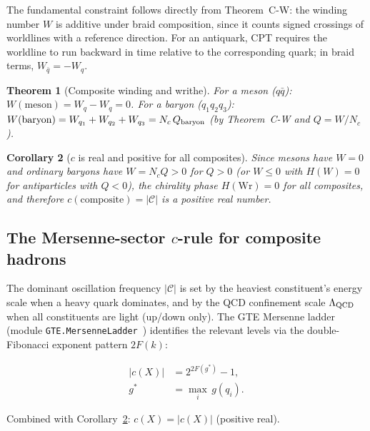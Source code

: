 \documentclass[11pt]{article}
\newtheorem{theorem}{Theorem}[section]
\newtheorem{corollary}[theorem]{Corollary}
\theoremstyle{remark}
\begin{document}
The fundamental constraint follows directly from Theorem~C-W:
the winding number $W$ is additive under braid composition, since it counts
signed crossings of worldlines with a reference direction.
For an antiquark, CPT requires the worldline to run backward in time relative to
the corresponding quark; in braid terms, $W_{\bar{q}} = -W_q$.

\begin{theorem}[Composite winding and writhe]
\label{thm:composite_winding}
For a meson ($q\bar{q}$): $W(\mathrm{meson}) = W_q - W_q = 0$.
For a baryon ($q_1 q_2 q_3$): $W(\mathrm{baryon}) = W_{q_1}+W_{q_2}+W_{q_3} = N_c\,Q_{\rm baryon}$
(by Theorem~C-W and $Q = W/N_c$).
\end{theorem}

\begin{corollary}[$c$ is real and positive for all composites]
\label{cor:composite_c_real}
Since mesons have $W=0$ and ordinary baryons have $W = N_c Q > 0$ for
$Q > 0$ (or $W \leq 0$ with $H(W)\!=\!0$ for antiparticles with $Q < 0$),
the chirality phase $H(\mathrm{Wr}) = 0$ for all composites,
and therefore $c(\mathrm{composite}) = |\mathcal{C}|$ is a positive real number.
\end{corollary}

\subsection{The Mersenne-sector $c$-rule for composite hadrons}
\label{subsec:composite_mersenne}

The dominant oscillation frequency $|\mathcal{C}|$ is set by the heaviest
constituent's energy scale when a heavy quark dominates, and by the QCD confinement
scale $\Lambda_{\rm QCD}$ when all constituents are light (up/down only).
The GTE Mersenne ladder (module \texttt{GTE.MersenneLadder}~\cite{ugp-lean})
identifies the relevant levels via the double-Fibonacci exponent pattern $2F(k)$:

\begin{tcolorbox}[colback=yellow!4,colframe=yellow!75!black,
  title={\textbf{Composite $c$-value: Mersenne-sector assignment}}]
\begin{align*}
  |c(X)| &= 2^{2F(g^*)}-1, \\
  g^* &= \max_i\, g(q_i).
\end{align*}
\begin{center}
\end{center}
Combined with Corollary~\ref{cor:composite_c_real}: $c(X) = |c(X)|$ (positive real).
\end{tcolorbox}
\end{document}

